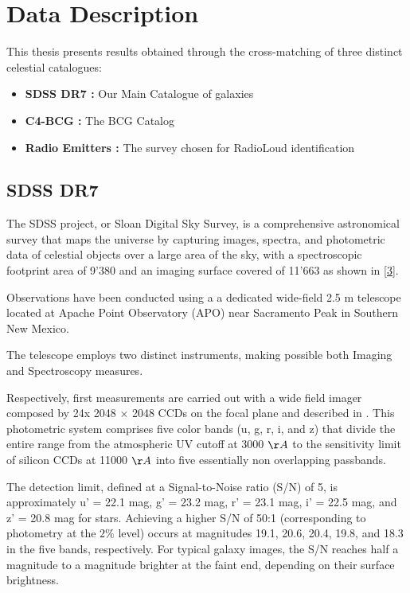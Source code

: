 \section{Data Description}
This thesis presents results obtained through the cross-matching of three distinct celestial catalogues:
\begin{itemize}
	\item\textbf{SDSS DR7 :} Our Main Catalogue of galaxies \cite{2009ApJS..182..543A,mpa-sdss-dr7}
	\item \textbf{C4-BCG :} The BCG Catalog \cite{2009yCat..73790867V}
	\item \textbf{Radio Emitters :}  The survey chosen for RadioLoud identification \cite{2005MNRAS.362....9B}
\end{itemize}

\subsection{SDSS DR7}
The SDSS project, or Sloan Digital Sky Survey, is a comprehensive astronomical survey that maps the universe by capturing images, spectra, and photometric data of celestial objects over a large area of the sky, with a spectroscopic footprint area of 9'380  and an imaging surface covered of  11'663  \cite{2009ApJS..182..543A} as shown in \autoref{3}.

Observations have been conducted using a a dedicated wide-field 2.5 m telescope \cite{2006AJ....131.2332G} located at Apache Point Observatory (APO) near Sacramento Peak in Southern New Mexico.

The telescope employs two distinct instruments, making possible both Imaging and Spectroscopy measures.

Respectively, first measurements are carried out with a wide field imager composed by 24x 2048 × 2048 CCDs on the focal plane and described in \cite{1998AJ....116.3040G}.
This photometric system comprises five color bands (u, g, r, i, and z) that divide the entire range from the atmospheric UV cutoff at 3000 $\AA$ to the sensitivity limit of silicon CCDs at 11000  $\AA$ into five essentially non overlapping passbands.

The detection limit, defined at a Signal-to-Noise ratio (S/N) of 5, is approximately u' = 22.1 mag, g' = 23.2 mag, r' = 23.1 mag, i' = 22.5 mag, and z' = 20.8 mag for stars.
Achieving a higher S/N of 50:1 (corresponding to photometry at the $2\%$ level) occurs at magnitudes 19.1, 20.6, 20.4, 19.8, and 18.3 in the five bands, respectively.
For typical galaxy images, the S/N reaches half a magnitude to a magnitude brighter at the faint end, depending on their surface brightness. \cite{1998AJ....116.3040G}

